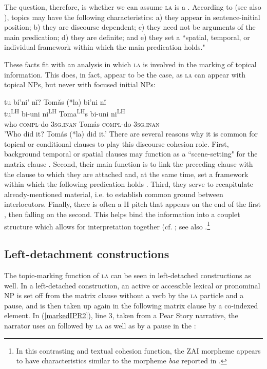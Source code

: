 The question, therefore, is whether we can assume \textsc{la} is a . According to \citet[50]{chafe1976} (see also \citealt{li1976}), topics may have the following characteristics: a) they appear in sentence-initial position; b) they are discourse dependent; c) they need not be arguments of the main predication; d) they are definite; and e) they set a ``spatial, temporal, or individual framework within which the main predication holds." 

These facts fit with an analysis in which \textsc{la} is involved in the marking of topical information. This does, in fact, appear to be the case, as \textsc{la} can appear with topical NPs, but never with focused initial NPs:

\ea
{}tu b\'{i}'ni' n\v{i}? Tom\v{a}s (*la) bi'ni n\v{i} \\
tu\textsuperscript{LH} bi-uni ni\textsuperscript{LH} Toma\textsuperscript{LH}s { } bi-uni ni\textsuperscript{LH}  \\
who \textsc{compl}-do 3\textsc{sg.inan} Tom\'{a}s { } \textsc{compl}-do 3\textsc{sg.inan}  \\
\glt 'Who did it? Tom\'{a}s (*la) did it.'
\z
There are several reasons why it is common for topical  or conditional clauses to play this discourse cohesion role. First, background temporal or spatial clauses may function as a ``scene-setting"  for the matrix clause \citep[125]{lambrecht1994}. Second, their main function is to link the preceding clause with the clause to which they are attached and, at the same time, set a framework within which the following predication holds \citep[294]{thompson2007}. Third, they serve to recapitulate already-mentioned material, i.e. to establish common ground between interlocutors. Finally, there is often a H pitch that appears on the end of the first , then falling on the second. This helps bind the information into a couplet structure which allows for interpretation together (cf. ; see also \citet[126--127]{sicoli2007}.\footnote{In this contrasting and textual cohesion function, the ZAI morpheme appears to have characteristics similar to the  morpheme  \textit{baa} reported in \citet[138-140]{matic2013}.}


\subsection{Left-detachment constructions}

The topic-marking function of \textsc{la} can be seen in left-detached constructions as well. In a left-detached construction, an active or accessible lexical or pronominal NP is set off from the matrix clause without a verb by the \textsc{la} particle and a pause, and is then taken up again in the following matrix clause by a co-indexed element. In (\ref{markedIPR2}), line 3, taken from a Pear Story narrative, the narrator uses an  followed by \textsc{la} as well as by a pause in the : 


